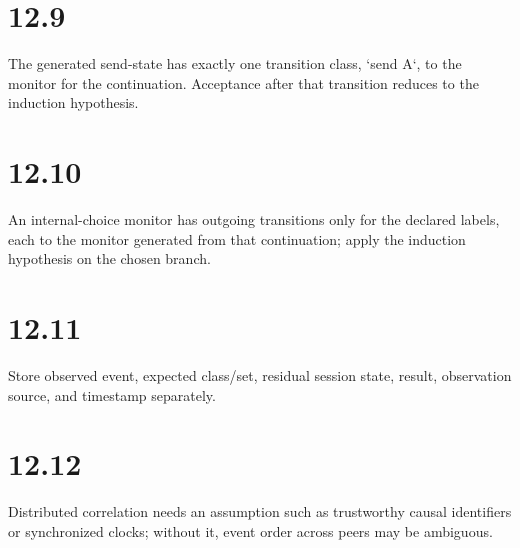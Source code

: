 \section*{12.9}
The generated send-state has exactly one transition class, `send A`, to the monitor for the continuation. Acceptance after that transition reduces to the induction hypothesis.

\section*{12.10}
An internal-choice monitor has outgoing transitions only for the declared labels, each to the monitor generated from that continuation; apply the induction hypothesis on the chosen branch.

\section*{12.11}
Store observed event, expected class/set, residual session state, result, observation source, and timestamp separately.

\section*{12.12}
Distributed correlation needs an assumption such as trustworthy causal identifiers or synchronized clocks; without it, event order across peers may be ambiguous.
